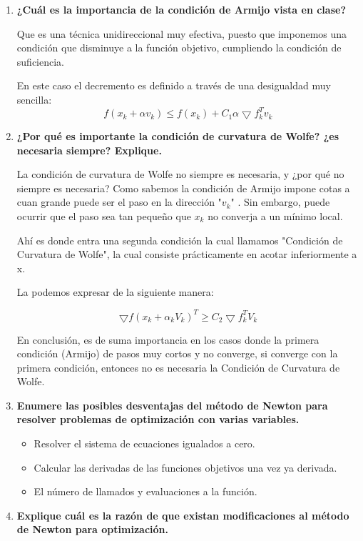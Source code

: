 \documentclass[12pt]{article}
\begin{document}
\begin{enumerate}
    \item \textbf{¿Cuál es la importancia de la condición de Armijo vista en clase?}
    
    Que es una técnica unidireccional muy efectiva, puesto que imponemos una condición que disminuye a la función objetivo, cumpliendo la condición de suficiencia.

		En este caso el decremento es definido a través de una desigualdad muy sencilla:
		\[f(x_k+\alpha v_k)\leq f(x_k)+C_1\alpha \bigtriangledown f_k^Tv_k\]
    \item \textbf{¿Por qué es importante la condición de curvatura de Wolfe? ¿es necesaria siempre? Explique.}
    
    La condición de curvatura de Wolfe no siempre es necesaria, y ¿por qué no siempre es necesaria?
		Como sabemos la condición de Armijo impone cotas a cuan grande puede ser el paso en la dirección "$v_k$" . Sin embargo, puede ocurrir que el paso sea tan pequeño que  $x_k$  no converja a un mínimo local.

		Ahí es donde entra una segunda condición la cual llamamos "Condición de Curvatura de Wolfe", la cual consiste prácticamente en acotar inferiormente a x.
		
		La podemos expresar de la siguiente manera:

			\[\bigtriangledown f(x_k+\alpha_kV_k)^T\geq C_2\bigtriangledown f_k^TV_k\]
		
		En conclusión, es de suma importancia en los casos donde la primera condición (Armijo) de pasos muy cortos y no converge, si converge con la primera condición, entonces no es necesaria la Condición de Curvatura de Wolfe.
    \item \textbf{Enumere las posibles desventajas del método de Newton para resolver problemas de optimización con varias variables.}
    
    \begin{itemize}
        \item Resolver el sistema de ecuaciones igualados a cero.
        \item Calcular las derivadas de las funciones objetivos una vez ya derivada.
        \item El número de llamados y evaluaciones a la función.
    \end{itemize}
    \item \textbf{Explique cuál es la razón de que existan modificaciones al método de Newton para optimización.}
    

\end{enumerate}
\end{document}
